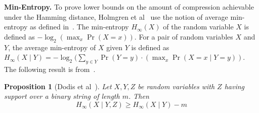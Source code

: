 \documentclass[pdflatex,sn-mathphys-num]{sn-jnl}
\newcommand{\descr}[1]{\vspace{0.2cm} \noindent \textbf{#1}}
\newtheorem{proposition}{Proposition}
\theoremstyle{definition}
\newcommand{\vtr}[1]{\mathbf{#1}}
\begin{document}


\descr{Min-Entropy.} To prove lower bounds on the amount of compression achievable under the Hamming distance, Holmgren et al~\cite{holmgren2022nearly} use the notion of average min-entropy as defined in~\cite{dodis-min-entropy}. The min-entropy $H_\infty(X)$ of the random variable $X$ is defined as $-\log_2 (\max_x \Pr(X = x))$. For a pair of random variables $X$ and $Y$, the average min-entropy of $X$ given $Y$ is defined as $H_\infty(X \mid Y) = -\log_2 (\sum_{y \in Y} \Pr(Y = y) \cdot (\max_x \Pr(X= x \mid Y= y))$. The following result is from~\cite{holmgren2022nearly, dodis-min-entropy}.

\begin{proposition}[Dodis et al~\cite{dodis-min-entropy}]
\label{prop:dodis}
Let $X, Y, Z$ be random variables with $Z$ having support over a binary string of length $m$. Then
\[
H_\infty(X \mid Y, Z) \geq H_\infty(X \mid Y) - m
\]
\end{proposition}
\end{document}
